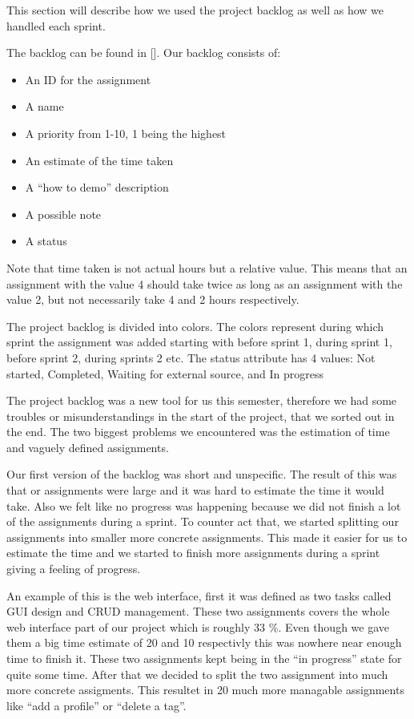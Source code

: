 This section will describe how we used the project backlog as well as how we handled each sprint.

The backlog can be found in [].
Our backlog consists of: 
\begin{itemize}
\item An ID for the assignment
\item A name 
\item A priority from 1-10, 1 being the highest
\item An estimate of the time taken
\item A ``how to demo'' description
\item A possible note
\item A status 	
\end{itemize}
Note that time taken is not actual hours but a relative value. This means that an assignment with the value 4 should take twice as long as an assignment with the value 2, but not necessarily take 4 and 2 hours respectively.

The project backlog is divided into colors. The colors represent during which sprint the assignment was added starting with before sprint 1, during sprint 1, before sprint 2, during sprints 2 etc. The status attribute has 4 values: Not started, Completed, Waiting for external source, and In progress

The project backlog was a new tool for us this semester, therefore we had some troubles or misunderstandings in the start of the project, that we sorted out in the end. The two biggest problems we encountered was the estimation of time and vaguely defined assignments. 

Our first version of the backlog was short and unspecific. The result of this was that or assignments were large and it was hard to estimate the time it would take. Also we felt like no progress was happening because we did not finish a lot of the assignments during a sprint. To counter act that, we started splitting our assignments into smaller more concrete assignments. This made it easier for us to estimate the time and we started to finish more assignments during a sprint giving a feeling of progress. 

An example of this is the web interface, first it was defined as two tasks called GUI design and CRUD management. These two assignments covers the whole web interface part of our project which is roughly 33 \%. Even though we gave them a big time estimate of 20 and 10 respectivly this was nowhere near enough time to finish it. These two assignments kept being in the ``in progress'' state for quite some time. After that we decided to split the two assignment into much more concrete assigments. This resultet in 20 much more managable assignments like ``add a profile'' or ``delete a tag''. 

